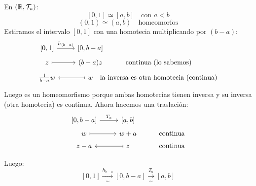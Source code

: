 \begin{ejem}
En $(\mathbb{R}, \mathcal{T}_u)$:
\[
    [0, 1] \simeq [a, b] \quad \text{con } a < b
\]
\[
    (0, 1) \simeq (a, b) \quad \text{homeomorfos}
\] Estiramos el intervalo $[0, 1]$ con una homotecia multiplicando por $(b - a)$:
$$ \bt 
    \left[0, 1\right] \rar{h_{(b-a)}} & \left[0, b - a\right] \\[-5mm] 
    z \rarmaps & (b - a)z &[-13mm]  \text{continua (lo sabemos)} \\[-5mm] 
    \frac{1}{b - a} w & \arrow[mapsto]{l} w &[-13mm]  \text{la inversa es otra homotecia (continua)}
    \et $$
Luego es un homeomorfismo porque ambas homotecias tienen inversa y su inversa (otra homotecia) es continua. Ahora hacemos una traslación:
$$ \bt
    \left[0, b-a\right] \rar{T_a} & \left[a, b\right] \\[-5mm] 
    w \rarmaps & w + a & \text{continua} \\[-5mm]
    z - a & \arrow[mapsto]{l} z & \text{continua}
    \et $$

Luego:
\[
    [0, 1] \xrightarrow[\sim]{h_{b-a}} [0, b-a] \xrightarrow[\sim]{T_a} [a, b]
\]
\end{ejem}
